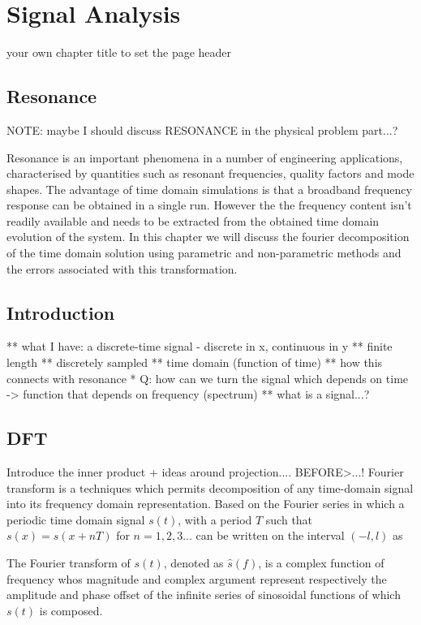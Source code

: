 \chapter{Signal Analysis}
\label{Ch:SignalAnalysis}  %
your own chapter title to set the page header

\section{Resonance} NOTE: maybe I should discuss RESONANCE in the physical
problem part...?

Resonance is an important phenomena in a number of engineering applications,
characterised by quantities such as resonant frequencies, quality factors and
mode shapes. The advantage of time domain simulations is that a broadband
frequency response can be obtained in a single run. However the the frequency
content isn't readily available and needs to be extracted from the obtained time
domain evolution of the system. In this chapter we will discuss the fourier
decomposition of the time domain solution using parametric and non-parametric
methods and the errors associated with this transformation.

\section{Introduction} ** what I have: a discrete-time signal - discrete in x,
continuous in y ** finite length ** discretely sampled ** time domain (function
of time) ** how this connects with resonance * Q: how can we turn the signal
which depends on time -> function that depends on frequency (spectrum) ** what
is a signal...?

\section{DFT} Introduce the inner product + ideas around projection.... %
BEFORE>...! Fourier transform is a techniques which permits decomposition of any
time-domain signal into its frequency domain representation. Based on the
Fourier series in which a periodic time domain signal $s(t)$, with a period $T$
such that $s(x)=s(x+nT)$ for $n=1,2,3 ...$ can be written on the interval
$(-l,l)$ as

The Fourier transform of $s(t)$, denoted as $\hat{s}(f)$, is a complex function
of frequency whos magnitude and complex argument represent respectively the
amplitude and phase offset of the infinite series of sinosoidal functions of
which $s(t)$ is composed.

